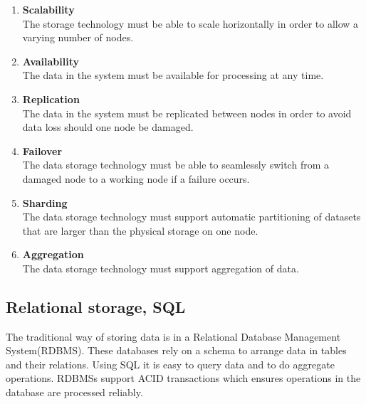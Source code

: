 \begin{enumerate}
\item \textbf{Scalability} \\
The storage technology must be able to scale horizontally in order to allow a varying number of nodes.

\item \textbf{Availability} \\
The data in the system must be available for processing at any time.

\item \textbf{Replication} \\
The data in the system must be replicated between nodes in order to avoid data loss should one node be damaged.
\item \textbf{Failover} \\
The data storage technology must be able to seamlessly switch from a damaged node to a working node if a failure occurs.

\item \textbf{Sharding} \\
The data storage technology must support automatic partitioning of datasets that are larger than the physical storage on one node.

\item \textbf{Aggregation} \\
The data storage technology must support aggregation of data.
\end{enumerate}

\subsection{Relational storage, SQL}
\label{sec:sql}
The traditional way of storing data is in a Relational Database Management System(RDBMS).
These databases rely on a schema to arrange data in tables and their relations.
Using SQL it is easy to query data and to do aggregate operations.
RDBMSs support ACID transactions which ensures operations in the database are processed reliably.


